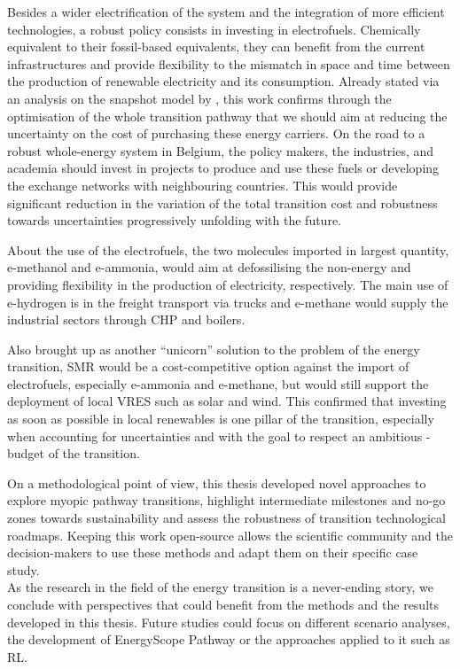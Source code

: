 Besides a wider electrification of the system and the integration of more efficient technologies, a robust policy consists in investing in electrofuels. Chemically equivalent to their fossil-based equivalents, they can benefit from the current infrastructures and provide flexibility to the mismatch in space and time between the production of renewable electricity and its consumption.  Already stated via an analysis on the snapshot model by \citet{rixhon2021role}, this work confirms through the optimisation of the whole transition pathway that we should aim at reducing the uncertainty on the cost of purchasing these energy carriers. On the road to a robust whole-energy system in Belgium, the policy makers, the industries, and academia should invest in projects to produce and use these fuels or developing the exchange networks with neighbouring countries. This would provide significant reduction in the variation of the total transition cost and robustness towards uncertainties progressively unfolding with the future. 

About the use of the electrofuels, the two molecules imported in largest quantity, e-methanol and e-ammonia, would aim at defossilising the non-energy and providing flexibility in the production of electricity, respectively. The main use of e-hydrogen is in the freight transport via trucks and e-methane would supply the industrial sectors through \gls{CHP} and boilers.

Also brought up as another ``unicorn'' solution to the problem of the energy transition, \gls{SMR} would be a cost-competitive option against the import of electrofuels, especially e-ammonia and e-methane, but would still support the deployment of local \acrfull{VRES} such as solar and wind. This confirmed that investing as soon as possible in local renewables is one pillar of the transition, especially when accounting for uncertainties and with the goal to respect an ambitious -budget of the transition. 

On a methodological point of view, this thesis developed novel approaches to explore myopic pathway transitions, highlight intermediate milestones and no-go zones towards sustainability and assess the robustness of transition technological roadmaps. Keeping this work open-source allows the scientific community and the decision-makers to use these methods and adapt them on their specific case study. \\


As the research in the field of the energy transition is a never-ending story, we conclude with perspectives that could benefit from the methods and the results developed in this thesis.  Future studies could focus on different scenario analyses, the development of EnergyScope Pathway or the approaches applied to it such as \gls{RL}. 

